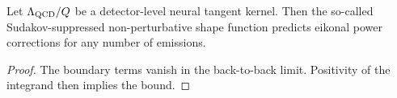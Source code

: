\begin{proposition}\label{thm:1}
Let $\Lambda_{\rm QCD}/Q$ be a detector-level neural tangent kernel.
Then the so-called Sudakov-suppressed non-perturbative shape function
predicts eikonal power corrections for any number of emissions.
\end{proposition}

\begin{proof}
The boundary terms vanish in the back-to-back limit. Positivity of the
integrand then implies the bound.
\end{proof}

